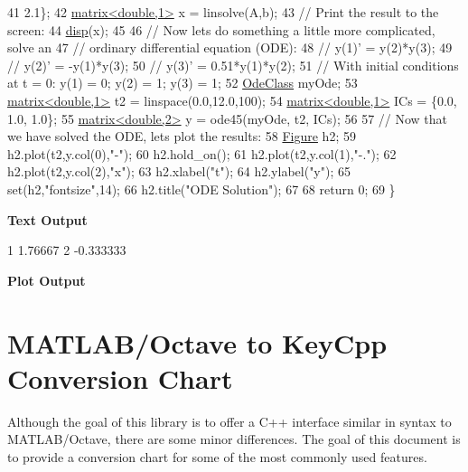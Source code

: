 \begin{DoxyCodeInclude}
41                           2.1\};
42     \hyperlink{classkeycpp_1_1matrix}{matrix<double,1>} x = linsolve(A,b);
43     \textcolor{comment}{// Print the result to the screen:}
44     \hyperlink{namespacekeycpp_af4a2245da139cf6cf2e03426476b3b88}{disp}(x);
45 
46     \textcolor{comment}{// Now lets do something a little more complicated, solve an}
47     \textcolor{comment}{// ordinary differential equation (ODE):}
48     \textcolor{comment}{// y(1)' = y(2)*y(3);}
49     \textcolor{comment}{// y(2)' = -y(1)*y(3);}
50     \textcolor{comment}{// y(3)' = 0.51*y(1)*y(2);}
51     \textcolor{comment}{// With initial conditions at t = 0: y(1) = 0; y(2) = 1; y(3) = 1;}
52     \hyperlink{class_ode_class}{OdeClass} myOde;
53     \hyperlink{classkeycpp_1_1matrix}{matrix<double,1>} t2 = linspace(0.0,12.0,100);
54     \hyperlink{classkeycpp_1_1matrix}{matrix<double,1>} ICs = \{0.0, 1.0, 1.0\};
55     \hyperlink{classkeycpp_1_1matrix}{matrix<double,2>} y = ode45(myOde, t2, ICs);
56     
57     \textcolor{comment}{// Now that we have solved the ODE, lets plot the results:}
58     \hyperlink{classkeycpp_1_1_figure}{Figure} h2;
59     h2.plot(t2,y.col(0),\textcolor{stringliteral}{"-"});
60     h2.hold\_on();
61     h2.plot(t2,y.col(1),\textcolor{stringliteral}{"-."});
62     h2.plot(t2,y.col(2),\textcolor{stringliteral}{"x"});
63     h2.xlabel(\textcolor{stringliteral}{"t"});
64     h2.ylabel(\textcolor{stringliteral}{"y"});
65     set(h2,\textcolor{stringliteral}{"fontsize"},14);
66     h2.title(\textcolor{stringliteral}{"ODE Solution"});
67     
68     \textcolor{keywordflow}{return} 0;
69 \}
\end{DoxyCodeInclude}
 \par
 \label{_output}%
 {\bfseries {\ttfamily Text} Output} 
\begin{DoxyCodeInclude}
1 1.76667
2 -0.333333
\end{DoxyCodeInclude}
 \par
 {\bfseries {\ttfamily Plot} Output}  \par
  \par


\section*{M\-A\-T\-L\-A\-B/\-Octave to Key\-Cpp Conversion Chart}

Although the goal of this library is to offer a C++ interface similar in syntax to M\-A\-T\-L\-A\-B/\-Octave, there are some minor differences. The goal of this document is to provide a conversion chart for some of the most commonly used features.

